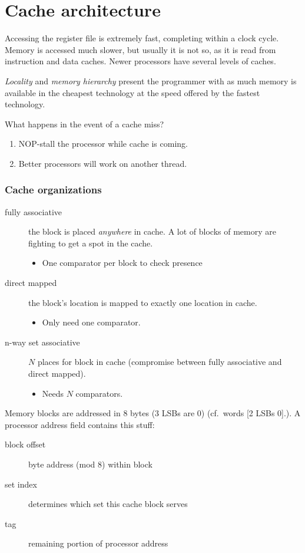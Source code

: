 \chapter{Cache architecture}
Accessing the register file is extremely fast, completing
within a clock cycle. Memory is accessed much slower, but
usually it is not so, as it is read from instruction and
data caches.
Newer processors have several levels of caches.

\emph{Locality} and \emph{memory hierarchy} present the programmer with as much memory is available in the cheapest technology at the speed offered by the fastest technology.

What happens in the event of a cache miss?
\begin{enumerate}
	\item NOP-stall the processor while cache is coming.
	\item Better processors will work on another thread.
\end{enumerate}

\subsection{Cache organizations}
\begin{description}
	\item [fully associative]
	the block is placed \emph{anywhere} in cache.
	A lot of blocks of memory are fighting to get a spot in the cache.
	\begin{itemize}
		\item One comparator per block to check presence
	\end{itemize}
	\item [direct mapped] the block's location is mapped to exactly one location in cache.
	\begin{itemize}
		\item Only need one comparator.
	\end{itemize}
	\item[n-way set associative] $N$ places for block in cache (compromise between fully associative and direct mapped).
	\begin{itemize}
		\item Needs $N$ comparators.
	\end{itemize}
\end{description}

Memory blocks are addressed in 8 bytes (3 LSBs are 0) (cf.~words [2 LSBs 0].).
A processor address field contains this stuff:
\begin{description}
	\item[block offset] byte address (mod 8) within block
	\item[set index] determines which set this cache block serves
	\item[tag] remaining portion of processor address
\end{description}

